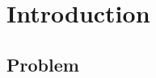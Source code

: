 \documentclass{note}
\numberwithin{equation}{chapter}
\begin{document}
\chapter{Introduction}

\section*{Problem}

\end{document}

